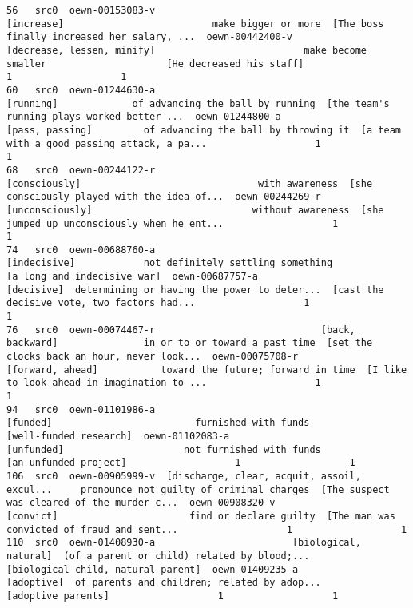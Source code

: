 \documentclass[a4paper,10pt,onecolumn,oneside,openright]{article}
\begin{document}
\begin{verbatim}
56   src0  oewn-00153083-v                                   [increase]                          make bigger or more  [The boss finally increased her salary, ...  oewn-00442400-v                   [decrease, lessen, minify]                          make become smaller                     [He decreased his staff]                   1                   1
60   src0  oewn-01244630-a                                    [running]             of advancing the ball by running  [the team's running plays worked better ...  oewn-01244800-a                              [pass, passing]         of advancing the ball by throwing it  [a team with a good passing attack, a pa...                   1                   1
68   src0  oewn-00244122-r                                [consciously]                               with awareness  [she consciously played with the idea of...  oewn-00244269-r                              [unconsciously]                            without awareness  [she jumped up unconsciously when he ent...                   1                   1
74   src0  oewn-00688760-a                                 [indecisive]            not definitely settling something                  [a long and indecisive war]  oewn-00687757-a                                   [decisive]  determining or having the power to deter...  [cast the decisive vote, two factors had...                   1                   1
76   src0  oewn-00074467-r                             [back, backward]               in or to or toward a past time  [set the clocks back an hour, never look...  oewn-00075708-r                             [forward, ahead]           toward the future; forward in time  [I like to look ahead in imagination to ...                   1                   1
94   src0  oewn-01101986-a                                     [funded]                         furnished with funds                       [well-funded research]  oewn-01102083-a                                   [unfunded]                     not furnished with funds                        [an unfunded project]                   1                   1
106  src0  oewn-00905999-v  [discharge, clear, acquit, assoil, excul...     pronounce not guilty of criminal charges  [The suspect was cleared of the murder c...  oewn-00908320-v                                    [convict]                       find or declare guilty  [The man was convicted of fraud and sent...                   1                   1
110  src0  oewn-01408930-a                        [biological, natural]  (of a parent or child) related by blood;...           [biological child, natural parent]  oewn-01409235-a                                   [adoptive]  of parents and children; related by adop...                           [adoptive parents]                   1                   1

\end{verbatim}
\end{document}
